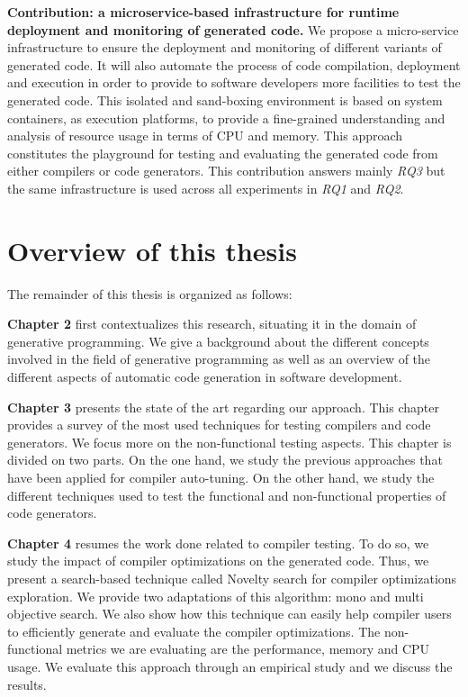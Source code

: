 \textbf{Contribution: a microservice-based infrastructure for runtime deployment and monitoring of generated code.}
We propose a micro-service infrastructure to ensure the deployment and monitoring of different variants of generated code. 
It will also automate the process of code compilation, deployment and execution in order to provide to software developers more facilities to test the generated code. 
This isolated and sand-boxing environment is based on system containers, as execution platforms, to provide a fine-grained understanding and analysis of resource usage in terms of CPU and memory. This approach constitutes the playground for testing and evaluating the generated code from either compilers or code generators. This contribution answers mainly \textit{RQ3} but the same infrastructure is used across all experiments in \textit{RQ1} and \textit{RQ2}.

\section{Overview of this thesis}
The remainder of this thesis is organized  as follows:

\textbf{Chapter 2} first contextualizes this research, situating it in the domain of generative programming. We give a background about the different concepts involved in the field of generative programming as well as an overview of the different aspects of automatic code generation in software development. 


\textbf{Chapter 3}  presents the state of the art regarding our approach. This chapter
provides a survey of the most used techniques for testing compilers and code generators. We focus more on the non-functional testing aspects.
This chapter is divided on two parts. On the one hand, we study the previous approaches that have been applied for compiler auto-tuning. On the other hand, we study the different techniques used to test the functional and non-functional properties of code generators. 

\textbf{Chapter 4} resumes the work done related to compiler testing. To do so, we study the impact of compiler optimizations on the generated code. Thus, we present a search-based technique called Novelty search for compiler optimizations exploration. We provide two adaptations of this algorithm: mono and multi objective search. We also show how this technique can easily help compiler users to efficiently generate and evaluate the compiler optimizations. The non-functional metrics we are evaluating are the performance, memory and CPU usage. We evaluate this approach through an empirical study and we discuss the results.


